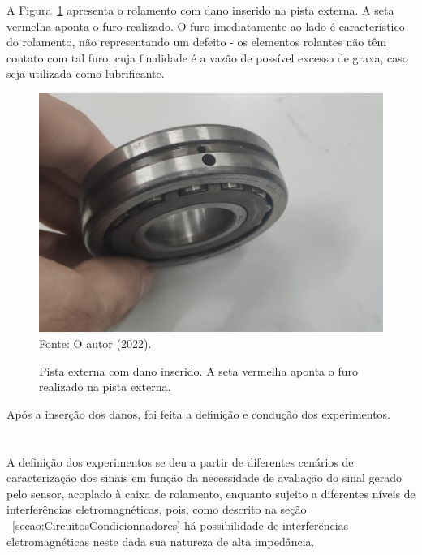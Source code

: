 \documentclass[
	12pt,				
	oneside,			
	a4paper,			
	english,			
	brazil,			
	]{abntex2ppgsi}
\begin{document}
A Figura~\ref{dano_pista_externa} apresenta o rolamento com dano inserido na pista externa. A seta vermelha aponta o furo realizado. O furo imediatamente ao lado é característico do rolamento, não representando um defeito - os elementos rolantes não têm contato com tal furo, cuja finalidade é a vazão de possível excesso de graxa, caso seja utilizada como lubrificante.

\begin{figure}[H]
\centering
\caption {Pista externa com dano inserido. A seta vermelha aponta o furo realizado na pista externa.}
\includegraphics[width=\textwidth,keepaspectratio]{dano_pista_externa_certo} \\
Fonte: O autor (2022).
\label{dano_pista_externa}
\end{figure}

Após a inserção dos danos, foi feita a definição e condução dos experimentos.

\section{}

A definição dos experimentos se deu a partir de diferentes cenários de caracterização dos sinais em função da necessidade de avaliação do sinal gerado pelo sensor, acoplado à caixa de rolamento, enquanto sujeito a diferentes níveis de interferências eletromagnéticas, pois, como descrito na seção ~\ref{secao:CircuitosCondicionnadores} há possibilidade de interferências eletromagnéticas neste dada sua natureza de alta impedância. 

\end{document}
